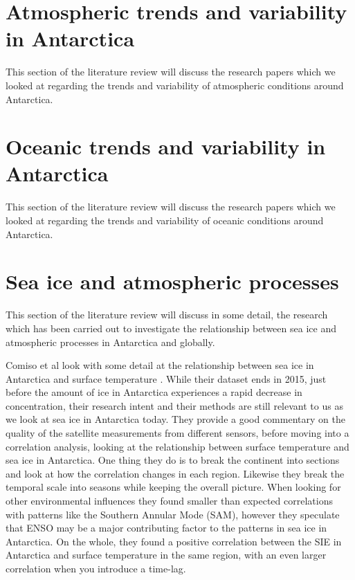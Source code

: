 \documentclass[../main.tex]{subfiles}
\begin{document}
\section{Atmospheric trends and variability in Antarctica}
This section of the literature review will discuss the research papers which we looked at regarding the trends and variability of atmospheric conditions around Antarctica.


\section{Oceanic trends and variability in Antarctica}
This section of the literature review will discuss the research papers which we looked at regarding the trends and variability of oceanic conditions around Antarctica.

\section{Sea ice and atmospheric processes}
This section of the literature review will discuss in some detail, the research which has been carried out to investigate the relationship between sea ice and atmospheric processes in Antarctica and globally.

Comiso et al look with some detail at the relationship between sea ice in Antarctica and surface temperature \cite{Comiso}. While their dataset ends in 2015, just before the amount of ice in Antarctica experiences a rapid decrease in concentration, their research intent and their methods are still relevant to us as we look at sea ice in Antarctica today. They provide a good commentary on the quality of the satellite measurements from different sensors, before moving into a correlation analysis, looking at the relationship between surface temperature and sea ice in Antarctica. One thing they do is to break the continent into sections and look at how the correlation changes in each region. Likewise they break the temporal scale into seasons while keeping the overall picture. When looking for other environmental influences they found smaller than expected correlations with patterns like the Southern Annular Mode (SAM), however they speculate that ENSO may be a major contributing factor to the patterns in sea ice in Antarctica. On the whole, they found a positive correlation between the SIE in Antarctica and surface temperature in the same region, with an even larger correlation when you introduce a time-lag. 
\end{document}
